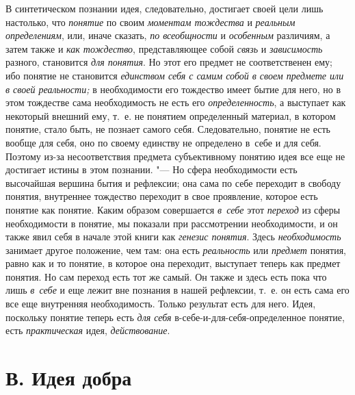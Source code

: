 В синтетическом познании идея, следовательно, достигает своей
цели лишь настолько, что {\em понятие}
по своим {\em моментам
тождества} и
{\em реальным определениям},
или, иначе сказать,
{\em по всеобщности} и
{\em особенным}
различиям, а затем также и
{\em как тождество},
представляющее собой
{\em связь} и
{\em зависимость}
разного, становится
{\em для понятия}. Но
этот его предмет не соответственен ему; ибо понятие не становится
{\em единством себя с самим собой в
своем предмете или в своей реальности;} в необходимости его
тождество имеет бытие для него, но в этом тождестве сама необходимость не
есть его {\em определенность},
а выступает как некоторый внешний ему, т.~е. не понятием
определенный материал, в котором понятие, стало быть, не познает самого
себя. Следовательно, понятие не есть вообще для себя, оно по своему
единству не определено в~себе и для себя. Поэтому из-за несоответствия
предмета субъективному понятию идея все еще не достигает
истины в этом познании. "--- Но сфера необходимости есть
высочайшая вершина бытия и рефлексии; она сама по себе переходит в свободу
понятия, внутреннее тождество переходит в свое проявление, которое есть
понятие как понятие. Каким образом совершается
{\em в~себе} этот
{\em переход} из сферы
необходимости в понятие, мы показали при рассмотрении необходимости, и он
также явил себя в начале этой книги как
{\em генезис понятия}.
Здесь {\em необходимость}
занимает другое положение, чем там: она есть
{\em реальность} или
{\em предмет} понятия,
равно как и то понятие, в которое она переходит, выступает теперь как
предмет понятия. Но сам переход есть тот же самый. Он также и здесь есть
пока что лишь {\em в~себе}
и еще лежит вне познания в нашей рефлексии, т.~е. он есть
сама его все еще внутренняя необходимость. Только результат есть для него.
Идея, поскольку понятие теперь есть
{\em для себя}
в-себе-и-для-себя-определенное понятие, есть
{\em практическая} идея,
{\em действование}.

\section[В. Идея добра]{В. Идея добра}

